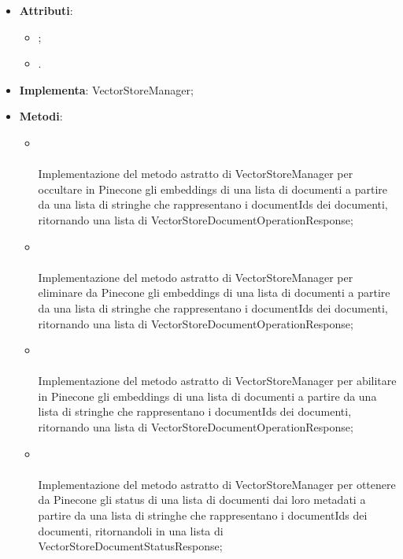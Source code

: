 \documentclass[10pt, a4paper]{article}
\begin{document}
\label{VectorStorePineconeManagerDettaglio}
\begin{itemize}
    \item \textbf{Attributi}:
    \begin{itemize}
        \item {};
        \item {}.
        
    \end{itemize}
    \item \textbf{Implementa}: VectorStoreManager;
    \item \textbf{Metodi}:
    \begin{itemize}
        \item {}\\ \\
        Implementazione del metodo astratto di VectorStoreManager per occultare in Pinecone gli embeddings di una lista di documenti a partire da una lista di stringhe che rappresentano i documentIds dei documenti, ritornando una lista di VectorStoreDocumentOperationResponse;

        \item {}\\ \\
        Implementazione del metodo astratto di VectorStoreManager per eliminare da Pinecone gli embeddings di una lista di documenti a partire da una lista di stringhe che rappresentano i documentIds dei documenti, ritornando una lista di VectorStoreDocumentOperationResponse;

        \item {}\\ \\
        Implementazione del metodo astratto di VectorStoreManager per abilitare in Pinecone gli embeddings di una lista di documenti a partire da una lista di stringhe che rappresentano i documentIds dei documenti, ritornando una lista di VectorStoreDocumentOperationResponse;

        \item {}\\ \\
        Implementazione del metodo astratto di VectorStoreManager per ottenere da Pinecone gli status di una lista di documenti dai loro metadati a partire da una lista di stringhe che rappresentano i documentIds dei documenti, ritornandoli in una lista di VectorStoreDocumentStatusResponse;


\end{itemize}
\end{itemize}
\end{document}
